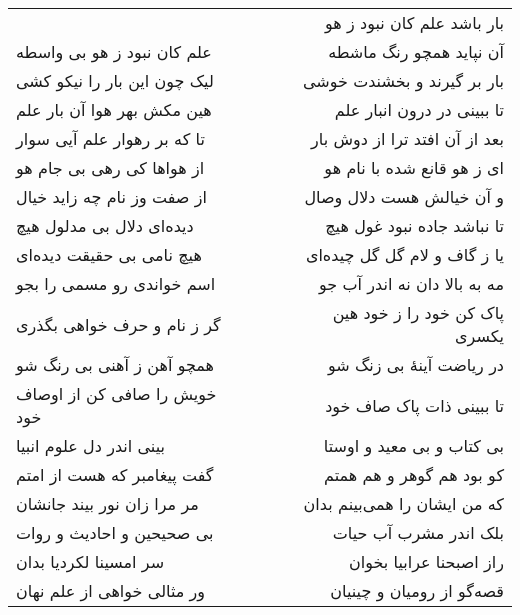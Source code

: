 \begin{center}
\begin{longtable}{l p{0.5cm} r}
&&
بار باشد علم کان نبود ز هو
\\
علم کان نبود ز هو بی واسطه
&&
آن نپاید همچو رنگ ماشطه
\\
لیک چون این بار را نیکو کشی
&&
بار بر گیرند و بخشندت خوشی
\\
هین مکش بهر هوا آن بار علم
&&
تا ببینی در درون انبار علم
\\
تا که بر رهوار علم آیی سوار
&&
بعد از آن افتد ترا از دوش بار
\\
از هواها کی رهی بی جام هو
&&
ای ز هو قانع شده با نام هو
\\
از صفت وز نام چه زاید خیال
&&
و آن خیالش هست دلال وصال
\\
دیده‌ای دلال بی مدلول هیچ
&&
تا نباشد جاده نبود غول هیچ
\\
هیچ نامی بی حقیقت دیده‌ای
&&
یا ز گاف و لام گل گل چیده‌ای
\\
اسم خواندی رو مسمی را بجو
&&
مه به بالا دان نه اندر آب جو
\\
گر ز نام و حرف خواهی بگذری
&&
پاک کن خود را ز خود هین یکسری
\\
همچو آهن ز آهنی بی رنگ شو
&&
در ریاضت آینهٔ بی زنگ شو
\\
خویش را صافی کن از اوصاف خود
&&
تا ببینی ذات پاک صاف خود
\\
بینی اندر دل علوم انبیا
&&
بی کتاب و بی معید و اوستا
\\
گفت پیغامبر که هست از امتم
&&
کو بود هم گوهر و هم همتم
\\
مر مرا زان نور بیند جانشان
&&
که من ایشان را همی‌بینم بدان
\\
بی صحیحین و احادیث و روات
&&
بلک اندر مشرب آب حیات
\\
سر امسینا لکردیا بدان
&&
راز اصبحنا عرابیا بخوان
\\
ور مثالی خواهی از علم نهان
&&
قصه‌گو از رومیان و چینیان
\\
\end{longtable}
\end{center}
